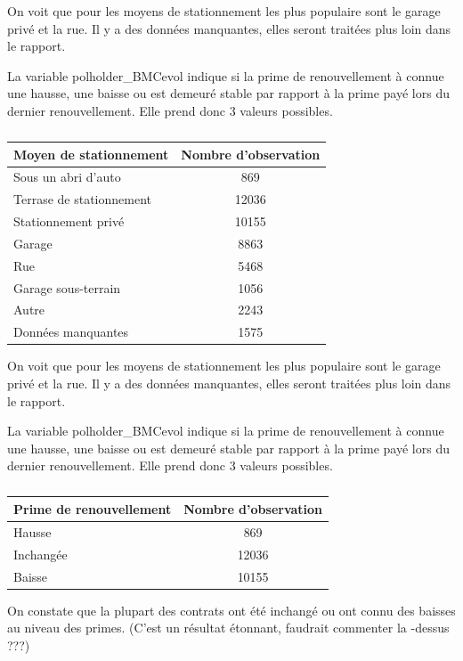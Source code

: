 \documentclass[
]{article}
\begin{document}
On voit que pour les moyens de stationnement les plus populaire sont le
garage privé et la rue. Il y a des données manquantes, elles seront
traitées plus loin dans le rapport.

La variable polholder\_BMCevol indique si la prime de renouvellement à
connue une hausse, une baisse ou est demeuré stable par rapport à la
prime payé lors du dernier renouvellement. Elle prend donc 3 valeurs
possibles.

\begin{table}[ht]
\centering
\caption{} 
\label{}
\begin{tabular}{lc}
  \hline
Moyen de stationnement & Nombre d'observation \\ 
  \hline
Sous un abri d'auto & 869 \\ 
  Terrase de stationnement & 12036 \\ 
  Stationnement privé & 10155 \\ 
  Garage & 8863 \\ 
  Rue & 5468 \\ 
  Garage sous-terrain & 1056 \\ 
  Autre & 2243 \\ 
  Données manquantes & 1575 \\ 
   \hline
\end{tabular}
\end{table}

On voit que pour les moyens de stationnement les plus populaire sont le
garage privé et la rue. Il y a des données manquantes, elles seront
traitées plus loin dans le rapport.

La variable polholder\_BMCevol indique si la prime de renouvellement à
connue une hausse, une baisse ou est demeuré stable par rapport à la
prime payé lors du dernier renouvellement. Elle prend donc 3 valeurs
possibles.

\begin{table}[ht]
\centering
\caption{} 
\label{}
\begin{tabular}{lc}
  \hline
Prime de renouvellement & Nombre d'observation \\ 
  \hline
Hausse & 869 \\ 
  Inchangée & 12036 \\ 
  Baisse & 10155 \\ 
   \hline
\end{tabular}
\end{table}

On constate que la plupart des contrats ont été inchangé ou ont connu
des baisses au niveau des primes. (C'est un résultat étonnant, faudrait
commenter la -dessus ???)
\end{document}
